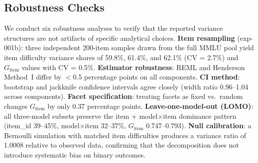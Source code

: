 \subsection{Robustness Checks}

We conduct six robustness analyses to verify that the reported variance structures are not artifacts of specific analytical choices. \textbf{Item resampling} (exp-001b): three independent 200-item samples drawn from the full MMLU pool yield item difficulty variance shares of 59.8\%, 61.4\%, and 62.1\% (CV = 2.7\%) and $G_\text{item}$ values with CV = 0.5\%. \textbf{Estimator robustness}: REML and Henderson Method~I differ by $<$0.5 percentage points on all components. \textbf{CI method}: bootstrap and jackknife confidence intervals agree closely (width ratio 0.96--1.04 across components). \textbf{Facet specification}: treating facets as fixed vs.\ random changes $G_\text{item}$ by only 0.37 percentage points. \textbf{Leave-one-model-out (LOMO)}: all three-model subsets preserve the item + model$\times$item dominance pattern (item\_id 39--45\%, model$\times$item 32--37\%, $G_\text{item}$ 0.747--0.793). \textbf{Null calibration}: a Bernoulli simulation with matched item difficulties produces a variance ratio of 1.0008 relative to observed data, confirming that the decomposition does not introduce systematic bias on binary outcomes.

